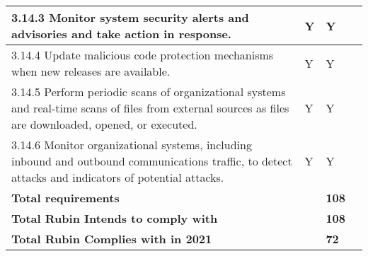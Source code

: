 \begin{longtable} {|p{}|p{}|p{}|p{} |}
{3.14.3 Monitor system security alerts and advisories and take action in response.}&{Y}&{Y}& \\ \hline
{3.14.4 Update malicious code protection mechanisms when new releases are available.}&{Y}&{Y}& \\ \hline
{3.14.5 Perform periodic scans of organizational systems and real-time scans of files from external sources as files are downloaded, opened, or executed.}&{Y}&{Y}& \\ \hline
{3.14.6 Monitor organizational systems, including inbound and outbound communications traffic, to detect attacks and indicators of potential attacks.}&{Y}&{Y}& \\ \hline
\textbf{Total requirements}&\textbf{}&\textbf{108}& \\ \hline
\textbf{Total Rubin Intends to comply with }&\textbf{}&\textbf{108}& \\ \hline
\textbf{Total Rubin Complies with in 2021}&\textbf{}&\textbf{72}& \\ \hline
\end{longtable} \normalsize
